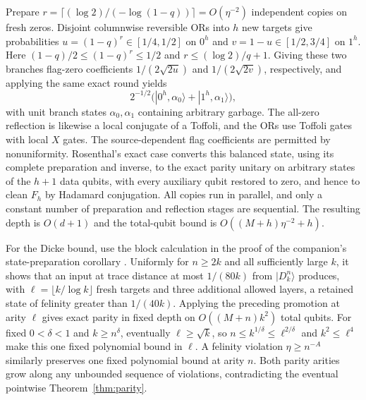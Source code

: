Prepare $r=\lceil(\log 2)/(-\log(1-q))\rceil=O(\eta^{-2})$
independent copies on fresh zeros. Disjoint columnwise reversible ORs
into $h$ new targets give probabilities
$u=(1-q)^r\in[1/4,1/2]$ on $0^h$ and $v=1-u\in[1/2,3/4]$ on $1^h$.
Here $(1-q)/2\le(1-q)^r\le1/2$ and $r\le(\log 2)/q+1$.
Giving these two branches flag-zero coefficients
$1/(2\sqrt{2u})$ and $1/(2\sqrt{2v})$, respectively, and applying
the same exact round yields
\[
 2^{-1/2}\bigl(|0^h,\alpha_0\rangle+|1^h,\alpha_1\rangle\bigr),
\]
with unit branch states $\alpha_0,\alpha_1$ containing arbitrary
garbage. The all-zero reflection is likewise a local conjugate of a Toffoli,
and the ORs use Toffoli gates with local $X$ gates. The source-dependent
flag coefficients are permitted by nonuniformity. Rosenthal's exact
case \citep[Theorem~3.1]{Rosenthal2021} converts this balanced state,
using its complete preparation and inverse, to the exact parity unitary
on arbitrary states of the $h+1$ data qubits, with every auxiliary
qubit restored to zero, and hence to clean $F_h$ by Hadamard conjugation. All copies
run in parallel, and only a constant number of preparation and
reflection stages are sequential. The resulting depth is $O(d+1)$
and the total-qubit bound is $O((M+h)\eta^{-2}+h)$.

For the Dicke bound, use the block calculation in the proof of the
companion's state-preparation corollary
\citep[Section~7.1, Corollary~8 and its proof]{OpenAILocalization2026}.
Uniformly for $n\ge2k$ and all sufficiently large $k$, it shows that
an input at trace distance at most $1/(80k)$ from $|D_k^n\rangle$
produces, with $\ell=\lfloor k/\log k\rfloor$ fresh targets and three
additional allowed layers, a retained state of felinity greater than
$1/(40k)$. Applying the preceding promotion at arity $\ell$ gives
exact parity in fixed depth on $O((M+n)k^2)$ total qubits. For fixed
$0<\delta<1$ and $k\ge n^\delta$, eventually $\ell\ge\sqrt k$, so
$n\le k^{1/\delta}\le\ell^{2/\delta}$ and $k^2\le\ell^4$ make this one fixed polynomial
bound in $\ell$. A felinity violation $\eta\ge n^{-A}$ similarly
preserves one fixed polynomial bound at arity $n$. Both parity arities
grow along any unbounded sequence of violations, contradicting the
eventual pointwise Theorem~\ref{thm:parity}.
